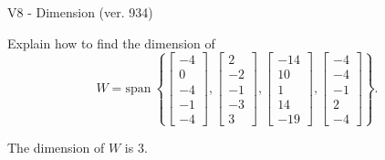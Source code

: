 \begin{exercise}
  \begin{exerciseTitle}V8 - Dimension (ver. 934)\end{exerciseTitle}
  \begin{exerciseStatement}
    Explain how to find the dimension of 
\[W=\mathrm{span}\ \left\{\left[\begin{array}{r}
-4 \\
0 \\
-4 \\
-1 \\
-4
\end{array}\right] , \left[\begin{array}{r}
2 \\
-2 \\
-1 \\
-3 \\
3
\end{array}\right] , \left[\begin{array}{r}
-14 \\
10 \\
1 \\
14 \\
-19
\end{array}\right] , \left[\begin{array}{r}
-4 \\
-4 \\
-1 \\
2 \\
-4
\end{array}\right]\right\}.\]



  \end{exerciseStatement}
  \begin{exerciseAnswer}
   The dimension of \(W\) is  \(3\).
  


  \end{exerciseAnswer}
\end{exercise}